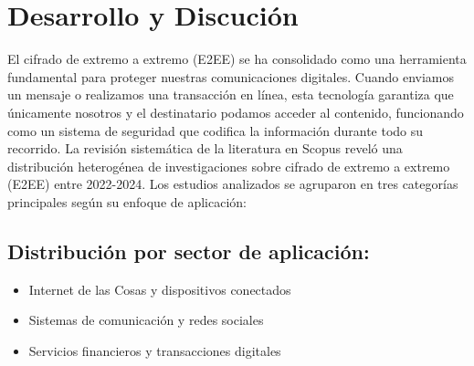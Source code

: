 \documentclass[spanish,12pt,a4paper]{article}
\begin{document}
		\section*{\normalsize Desarrollo y Discución }
		\begin{multicols}{2}
		El cifrado de extremo a extremo (E2EE) se ha consolidado como una herramienta fundamental para proteger nuestras comunicaciones digitales. Cuando enviamos un mensaje o realizamos una transacción en línea, esta tecnología garantiza que únicamente nosotros y el destinatario podamos acceder al contenido, funcionando como un sistema de seguridad que codifica la información durante todo su recorrido.
		La revisión sistemática de la literatura en Scopus reveló una distribución heterogénea de investigaciones sobre cifrado de extremo a extremo (E2EE) entre 2022-2024. Los estudios analizados se agruparon en tres categorías principales según su enfoque de aplicación:
	\end{multicols}
	\subsection*{\normalsize Distribución por sector de aplicación:}
	\begin{figure}[H]
		\centering
	\end{figure}
	\begin{itemize}
		\item Internet de las Cosas y dispositivos conectados
		\item Sistemas de comunicación y redes sociales
		\item Servicios financieros y transacciones digitales
	\end{itemize}
	
\end{document}
